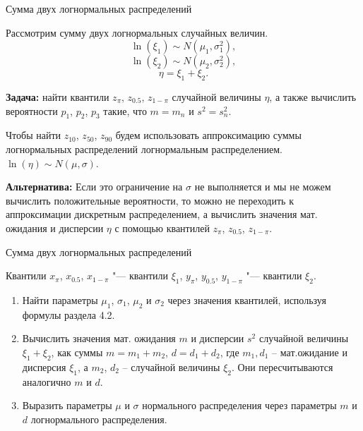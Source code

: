 \documentclass[ucs, notheorems, handout]{beamer}
\newenvironment{pr1}{\par\noindent{\bf Дано:}}{}
\begin{document}
\begin{frame}{Сумма двух логнормальных распределений }
	
		Рассмотрим сумму двух логнормальных случайных величин.
	\begin{equation*}
		\ln(\xi_{1}) \sim N(\mu_{1}, \sigma _{1}^{2}),
	\end{equation*}
	\begin{equation*}
		\ln(\xi_{2}) \sim N(\mu_{2}, \sigma _{2}^{2}),
	\end{equation*}
	\begin{equation*}
		\eta = \xi_{1}+\xi_{2}.
	\end{equation*}
	
	\textbf{Задача:} найти квантили $z_{\pi}$, $z_{0.5}$, $z_{1-\pi}$ случайной величины $\eta$, а также вычислить вероятности $p_{1}$, $p_{2}$, $p_{3}$ такие, что $m = m_{n}$  и $s^{2} = s^{2}_{n}$.
	
	Чтобы найти $z_{10}$, $z_{50}$, $z_{90}$ будем использовать аппроксимацию суммы логнормальных распределений логнормальным распределением. $\ln(\eta)\sim N(\mu, \sigma)$.
	
	\textbf{Альтернатива:}
	Если это ограничение на $\sigma$ не выполняется и мы не можем вычислить положительные вероятности, то можно не переходить к аппроксимации дискретным распределением, а вычислить значения мат. ожидания и дисперсии $\eta$ с помощью квантилей $z_{\pi}$, $z_{0.5}$, $z_{1-\pi}$.
	
\end{frame}

\begin{frame}{Сумма двух логнормальных распределений }
	
	\begin{pr1}
		Квантили $x_{\pi}$, $x_{0.5}$, $x_{1-\pi}$ "--- квантили $\xi_{1}$, $y_{\pi}$, $y_{0.5}$, $y_{1-\pi}$ "--- квантили $\xi_{2}$.
	\end{pr1}
	\begin{enumerate}
		\item Найти параметры $\mu_{1}$, $\sigma_{1}$, $\mu_{2}$ и $\sigma_{2}$ через значения квантилей, используя формулы раздела 4.2.
		\item Вычислить значения мат. ожидания $m$ и дисперсии $s^{2}$ случайной величины $\xi_{1} + \xi_{2}$, как суммы $m = m_{1}+m_{2}$, $d=d_{1} + d_{2}$, где $m_{1}, d_{1}$ -- мат.ожидание и дисперсия $\xi_{1}$, а $m_{2}$, $d_{2}$ -- случайной величины $\xi_{2}$. Они пересчитываются аналогично $m$ и $d$.
		\item Выразить параметры $\mu$ и $\sigma$ нормального распределения через параметры $m$ и $d$ логнормального распределения.
		
	\end{enumerate}
	
	
	
\end{frame}
	
\end{document}
